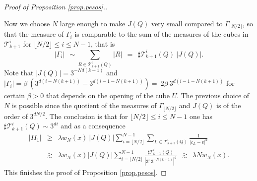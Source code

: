 \documentclass[11pt]{amsart}
\theoremstyle{definition}
\begin{document}
\begin{proof}[Proof of Proposition \ref{prop.pesos}.]
\begin{center}
\end{center}

\bigskip

Now we choose $N$ large enough to make $J(Q)$ very small compared to $\Gamma_{\lfloor N/2\rfloor}$, so that the measure of $\Gamma_{i}$ is comparable to the sum of the measures of the cubes in $\mathcal T_{k+1}^i$ for $\lfloor N/2\rfloor\leq i\leq N-1$, that is
\[
|\Gamma_{i}|\ \ \sim \sum_{R\in \mathcal T_{k+1}^{i}(Q)} |R|\ \ =\ \ \sharp \mathcal T_{k+1}^{i}(Q)\ |J(Q)|.
\]
Note that $|J(Q)|=3^{-Nd(k+1)}$ and $|\Gamma_i|= \beta\  (3^{d(i-N(k+1))}-3^{d(i-1-N(k+1))})=\ 2\beta\ 3^{d(i-1-N(k+1))}$ for certain $\beta>0$ that depends on the opening of the cube $U$. The previous choice of $N$ is possible since the quotient of the measures of $\Gamma_{\lfloor N/2\rfloor}$ and $J(Q)$ is of the order of $3^{dN/2}$. The conclusion is that for $\lfloor N/2\rfloor\leq i\leq N-1$ one has $\sharp \mathcal T_{k+1}^i(Q) \sim 3^{di}$ and as a consequence
\begin{eqnarray*}
|I\!I_1| &\geq& \lambda w_N(x)\ |J(Q)| \sum_{i=\lfloor N/2\rfloor}^{N-1}\sum_{L\in \mathcal T_{k+1}^i(Q)} \frac1{|c_L-v|^d} \\&\gtrsim& \lambda w_N(x)|J(Q)| \sum_{i=\lfloor N/2\rfloor}^{N-1} \frac{\sharp \mathcal T_{k+1}^i(Q)}{|3^{i}\ 3^{-N(k+1)}|^d}\ \ \gtrsim\ \ \lambda N w_N(x).
\end{eqnarray*}
This finishes the proof of Proposition \ref{prop.pesos}.

\end{proof}
\end{document}
